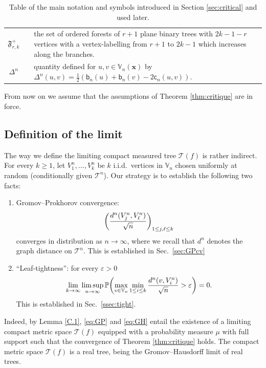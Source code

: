 \documentclass[11pt]{article}
\theoremstyle{plain}
\theoremstyle{definition}
\theoremstyle{remark}
\newcommand{\1}{\mathbbm{1}} %
\newcommand{\proba}[1]{\mathbb{P}\left(#1\right)} %
\newcommand{\e}{\varepsilon} %
\newcommand{\T}{\mathcal{T}} %
\newcommand{\birth}{\mathsf{b}} %
\newcommand{\coal}{\mathsf{c}} %
\newcommand{\Xb}{\mathrm{\mathbf{x}}} %
\newcommand{\V}{\mathbb{V}} %
\let\originalleft\left
\let\originalright\right
\renewcommand{\left}{\mathopen{}\mathclose\bgroup\originalleft}
\renewcommand{\right}{\aftergroup\egroup\originalright}
\begin{document}
\begin{table}[htbp]\caption{{Table of the main notation and symbols introduced in Section \ref{sec:critical} and used later.}}
\centering
{\begin{tabular}{c c p{12cm} }
\toprule
$\mathfrak{F}^+_{r,k}$ && the set of ordered forests of $r+1$ plane binary trees with $2k-1-r$ vertices with a vertex-labelling from $r+1$ to $2k-1$ which increases along the branches. \\
$\Delta^{n}$ &&
       quantity defined for $u,v \in  \V_{n}(\Xb)$ by $\displaystyle \Delta^{n}(u,v) = \frac{1}{2}(\birth_n(u)+\birth_n(v)-2 \coal_n(u,v))$. \\
\bottomrule
\end{tabular}
}
\label{tab:seccritical}
\end{table}


{
From now on we assume that the assumptions of Theorem \ref{thm:critique} are in force.
}

\subsection{Definition of the limit}
\label{sec:deflim}

The way  we define the limiting compact measured tree $\T(f)$ is rather indirect. For every $ k \geq 1$, let $V_1^n,\ldots,V_k^n$ be $k$ i.i.d.~vertices in $\V_{n}$ chosen uniformly at random (conditionally given $\T^n$). Our strategy is to establish the following two facts:
\begin{enumerate}
\item[--] Gromov--Prokhorov convergence: 
\begin{equation}
\label{eq:GP}
\left(\frac{d^n(V_j^n,V_\ell^n)}{\sqrt{n}} \right)_{1\le j,\ell\le k}
\end{equation}
converges in distribution as $ n \rightarrow \infty$, where we recall that $d^{n}$ denotes the graph distance on $\T^{n}$. This is established in Sec.~\ref{sec:GPcv}
\item[--] ``Leaf-tightness'': for every $\varepsilon>0$
\begin{equation}
\label{eq:GH}
\lim_{k\to \infty} \limsup_{n\to \infty} \proba{\max_{v\in \V_{n}}  \min_{1\leq i \leq k} \frac{d^n(v,V^{n}_i)}{\sqrt{n}}>\e}=0.
\end{equation}
This is established in Sec.~\ref{ssec:tight}.
\end{enumerate} 

Indeed, by Lemma \ref{C.1}, \eqref{eq:GP} and \eqref{eq:GH} entail the existence of a limiting compact metric space $\T(f)$ equipped with a probability measure $\mu$ with full support such that the convergence of Theorem \ref{thm:critique} holds. The compact metric space $\T(f)$ is a real tree, being the Gromov--Hausdorff limit of real trees.
\end{document}
